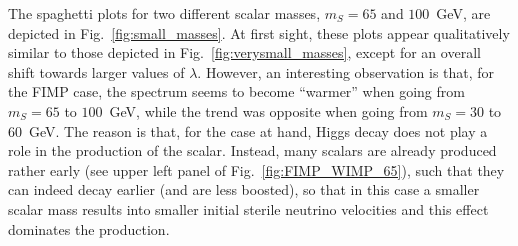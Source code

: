 The spaghetti plots for two different scalar masses, $m_S = 65$ and $100$~GeV, are depicted in Fig.~\ref{fig:small_masses}. At first sight, these plots appear qualitatively similar to those depicted in Fig.~\ref{fig:verysmall_masses}, except for an overall shift towards larger values of $\lambda$. However, an interesting observation is that, for the FIMP case, the spectrum seems to become ``warmer'' when going from $m_S = 65$ to $100$~GeV, while the trend was opposite when going from $m_S = 30$ to $60$~GeV. The reason is that, for the case at hand, Higgs decay does not play a role in the production of the scalar. Instead, many scalars are already produced rather early (see upper left panel of Fig.~\ref{fig:FIMP_WIMP_65}), such that they can indeed decay earlier (and are less boosted), so that in this case a smaller scalar mass results into smaller initial sterile neutrino velocities and this effect dominates the production. 

